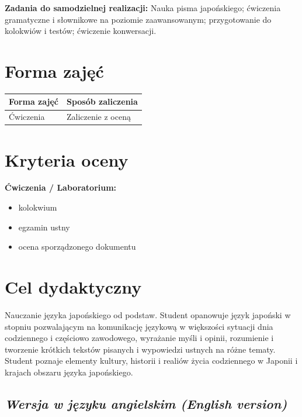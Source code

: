 \documentclass[12pt, a4paper]{article}
\newcommand{\thdrule}{\noalign{\global\setlength{\extrarowheight}{0pt}}}
\newcommand{\thdend}{\noalign{\global\setlength{\extrarowheight}{3pt}}}
\begin{document}
\vspace{4pt}
\noindent\textbf{Zadania do samodzielnej realizacji:} Nauka pisma japońskiego; ćwiczenia gramatyczne i słownikowe na poziomie zaawansowanym; przygotowanie do kolokwiów i testów; ćwiczenie konwersacji.

\section{Forma zajęć}

\begin{center}
{\scriptsize
\begin{tabular}{m{5cm}m{8cm}}
\thdrule\toprule
\rowcolor{pjatkRed} {\color{white}\textbf{Forma zajęć}} & {\color{white}\textbf{Sposób zaliczenia}} \\
\midrule\thdend
  \rowcolor{tableRowLight} Ćwiczenia & Zaliczenie z oceną \\
\bottomrule
\end{tabular}}
\end{center}

\section{Kryteria oceny}

\textbf{Ćwiczenia / Laboratorium:}
\begin{itemize}
  \item kolokwium
  \item egzamin ustny
  \item ocena sporządzonego dokumentu
\end{itemize}


\section{Cel dydaktyczny}

Nauczanie języka japońskiego od podstaw. Student  opanowuje język japoński w stopniu pozwalającym na komunikację językową w większości sytuacji dnia codziennego i częściowo zawodowego, wyrażanie myśli i opinii, rozumienie i tworzenie krótkich tekstów pisanych i wypowiedzi ustnych na różne tematy. Student poznaje elementy kultury, historii i realiów życia codziennego w Japonii i krajach obszaru języka japońskiego.

\subsection*{\textit{Wersja w języku angielskim (English version)}}
\end{document}
